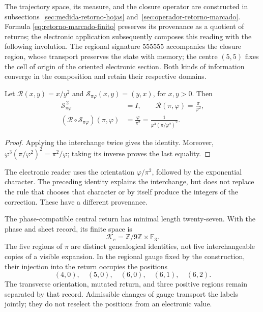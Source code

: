 The trajectory space, its measure, and the closure operator are
constructed in subsections~\ref{sec:medida-retorno-hojas}
and~\ref{sec:operador-retorno-marcado}. Formula
\eqref{eq:retorno-marcado-finito} preserves its provenance as a quotient
of returns; the electronic application subsequently composes this reading
with the following involution. The regional signature \(555555\) accompanies
the closure region, whose transport preserves the state with memory;
the centre \((5,5)\) fixes the cell of origin of the oriented electronic
section. Both kinds of information converge in the composition and retain
their respective domains.

\begin{lemma}
Let \(\mathcal R(x,y)=x/y^2\) and
\(\mathscr S_{\pi\varphi}(x,y)=(y,x)\), for \(x,y>0\).
Then
\begin{equation}
 \begin{aligned}
 \mathscr S_{\pi\varphi}^{\,2}&=I,\qquad
 \mathcal R(\pi,\varphi)=\frac{\pi}{\varphi^2},\\
 (\mathcal R\circ\mathscr S_{\pi\varphi})(\pi,\varphi)
 &=\frac{\varphi}{\pi^2}
 =\frac1{\varphi^3(\pi/\varphi^2)^2}.
 \end{aligned}
 \label{eq:el-bisagra}
\end{equation}
\end{lemma}
\begin{proof}
Applying the interchange twice gives the identity. Moreover,
\(\varphi^3(\pi/\varphi^2)^2=\pi^2/\varphi\); taking its inverse proves
the last equality.
\end{proof}

The electronic reader uses the orientation \(\varphi/\pi^2\),
followed by the exponential character. The preceding identity explains the
interchange, but does not replace the rule that chooses that character or
by itself produce the integers of the correction. These have a different provenance.

The phase-compatible central return has minimal length
twenty-seven. With the phase and sheet record, its finite space is
\[
 \mathcal K_e=\mathbb Z/9\mathbb Z\times\mathbb F_3.
\]
The five regions of \(\pi\) are distinct genealogical identities,
not five interchangeable copies of a visible expansion. In the regional
gauge fixed by the construction, their injection into the return occupies
the positions
\begin{equation}
 (4,0),\quad(5,0),\quad(6,0),\quad(6,1),\quad(6,2).
 \label{eq:el-cinco-lugares}
\end{equation}
The transverse orientation, mutated return, and three positive
regions remain separated by that record. Admissible changes
of gauge transport the labels jointly; they do not reselect
the positions from an electronic value.

